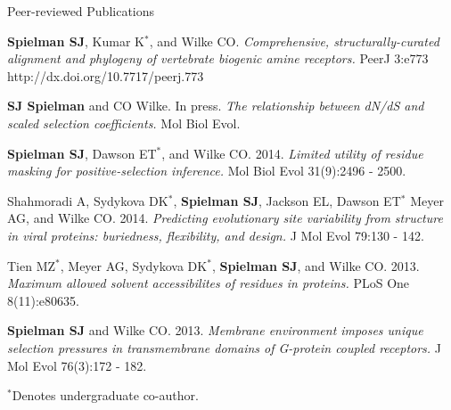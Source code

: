 \documentclass{resume} %
\begin{document}
\vspace*{0.5cm}
\begin{rSection}{Peer-reviewed Publications}
\vspace*{0.25cm}

\begin{etaremune}[leftmargin=1.5em]
	
\item \textbf{Spielman SJ}, Kumar K$^\ast$, and Wilke CO.  \emph{Comprehensive, structurally-curated alignment and phylogeny of vertebrate biogenic amine receptors.} PeerJ 3:e773 http://dx.doi.org/10.7717/peerj.773 \\ 


\item \textbf{SJ Spielman} and CO Wilke. In press. \emph{The relationship between dN/dS and scaled selection coefficients.} Mol Biol Evol. \\

\item \textbf{Spielman SJ}, Dawson ET$^\ast$, and Wilke CO. 2014. \emph{Limited utility of residue masking for positive-selection inference.} Mol Biol Evol 31(9):2496 - 2500. \\


\item Shahmoradi A, Sydykova DK$^\ast$, \textbf{Spielman SJ}, Jackson EL, Dawson ET$^\ast$ Meyer AG, and Wilke CO. 2014. \emph{Predicting evolutionary site variability from structure in viral proteins: buriedness, flexibility, and design.} J Mol Evol 79:130 - 142. \\


\item Tien MZ$^\ast$, Meyer AG, Sydykova DK$^\ast$, \textbf{Spielman SJ}, and Wilke CO. 2013. \emph{Maximum allowed solvent accessibilites of residues in proteins.} PLoS One 8(11):e80635. \\


\item \textbf{Spielman SJ} and Wilke CO. 2013. \emph{Membrane environment imposes unique selection pressures in transmembrane domains of G-protein coupled receptors.} J Mol Evol 76(3):172 - 182. \\

\end{etaremune}

$^\ast$Denotes undergraduate co-author.


\end{rSection}
\end{document}
